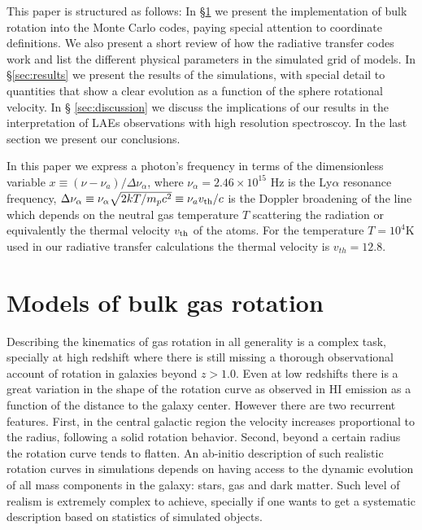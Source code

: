 \documentclass{emulateapj}
\newcommand{\ly}{{\ifmmode{{\rm Ly}\alpha~}\else{Ly$\alpha$~}\fi}}
\newcommand{\kms}{{\ifmmode{{\mathrm{\,km\ s}^{-1}}}\else{\,km~s$^{-1}$}\fi}}
\begin{document}
This paper is structured as follows: In \S \ref{sec:implementation} we
present the implementation of bulk rotation into the Monte Carlo
codes, paying special attention to coordinate definitions. We also
present a short review of how the \ly radiative transfer codes work
and list the different physical parameters in the simulated grid of
models. In \S \ref{sec:results} we present the results of the
simulations, with special detail to quantities that show a
clear evolution as a function of the sphere rotational velocity. In \S
\ref{sec:discussion} we discuss the implications of our results in the
interpretation of LAEs observations with high resolution
spectroscoy. In the last section we present our conclusions.    


In this paper we express a photon's frequency in terms of the
dimensionless variable $x\equiv (\nu -\nu_a)/\Delta\nu_\alpha$, where
$\nu_{\alpha}=2.46\times 10^{15}$ Hz is the Ly$\alpha$ resonance
frequency,  $\Delta\nu_{\alpha} \equiv
\nu_{\alpha}\sqrt{2kT/m_pc^2}\equiv \nu_av_{\rm th}/c $ is the Doppler
broadening of the line which depends on the neutral gas temperature
$T$ scattering the radiation or equivalently the thermal velocity
$v_{\rm th}$ of the atoms.  For the temperature $T=10^4$K used in our
radiative transfer calculations the thermal velocity is
$v_{th}=12.8$\kms.  




\section{Models of bulk gas rotation}
\label{sec:implementation}

Describing the kinematics of gas rotation in all generality is a
complex task, specially at high redshift where there is still missing
a thorough observational account of rotation in galaxies beyond
$z>1.0$. Even at low redshifts there is a great
variation in the shape of the rotation curve as observed in HI
emission as a function of the distance to the galaxy center. However
there are two recurrent features. First, in the
central galactic region the velocity increases proportional to the radius,
following a solid rotation behavior. Second, beyond a certain radius
the rotation curve tends to flatten.  An ab-initio description of
such realistic rotation curves in simulations depends on having access to
the dynamic evolution of all mass components in the galaxy: stars, gas
and dark matter. Such level of realism is extremely complex to
achieve, specially if one wants to get a systematic description based
on statistics of simulated objects. 
\end{document}
